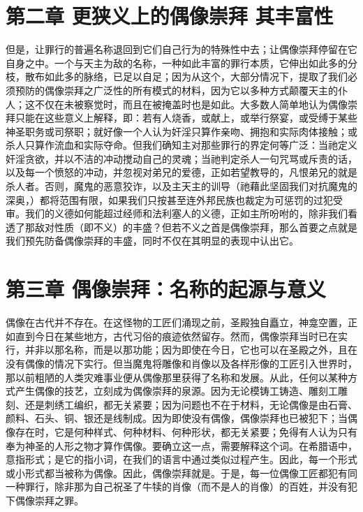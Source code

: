 
\section{第二章 更狭义上的偶像崇拜 其丰富性}

但是，让罪行的普遍名称退回到它们自己行为的特殊性中去；让偶像崇拜停留在它自身之中。一个与天主为敌的名称，一种如此丰富的罪行本质，它伸出如此多的分枝，散布如此多的脉络，已足以自足；因为从这个，大部分情况下，提取了我们必须预防的偶像崇拜之广泛性的所有模式的材料，因为它以多种方式颠覆天主的仆人；这不仅在未被察觉时，而且在被掩盖时也是如此。大多数人简单地认为偶像崇拜只能在这些意义上解释，即：若有人烧香，或献上，或举行祭宴，或受缚于某些神圣职务或司祭职；就好像一个人认为奸淫只算作亲吻、拥抱和实际肉体接触；或杀人只算作流血和实际夺命。但我们确知主对那些罪行的界定何等广泛：当祂定义奸淫贪欲，并以不洁的冲动搅动自己的灵魂；当祂判定杀人一句咒骂或斥责的话，以及每一个愤怒的冲动，并忽视对弟兄的爱德，正如若望教导的，凡恨弟兄的就是杀人者。否则，魔鬼的恶意狡诈，以及主天主的训导（祂藉此坚固我们对抗魔鬼的深奥，）都将范围有限，如果我们只按甚至连外邦民族也裁定为可惩罚的过犯受审。我们的义德如何能超过经师和法利塞人的义德，正如主所吩咐的，除非我们看透了那敌对性质（即不义）的丰盛？但若不义之首是偶像崇拜，那么首要之点就是我们预先防备偶像崇拜的丰盛，同时不仅在其明显的表现中认出它。\par


\section{第三章 偶像崇拜：名称的起源与意义}

偶像在古代并不存在。在这怪物的工匠们涌现之前，圣殿独自矗立，神龛空置，正如直到今日在某些地方，古代习俗的痕迹依然留存。然而，偶像崇拜当时已在实行，并非以那名称，而是以那功能；因为即使在今日，它也可以在圣殿之外，且在没有偶像的情况下实行。但当魔鬼将雕像和肖像以及各样形像的工匠引入世界时，那以前粗陋的人类灾难事业便从偶像那里获得了名称和发展。从此，任何以某种方式产生偶像的技艺，立刻成为偶像崇拜的泉源。因为无论模铸工铸造、雕刻工雕刻、还是刺绣工编织，都无关紧要；因为问题也不在于材料，无论偶像是由石膏、颜料、石头、铜、银还是线制成。因为即使没有偶像，偶像崇拜也已被犯下；当偶像存在时，它是何种样式、何种材料、何种形状，都无关紧要；免得有人认为只有奉为神圣的人形之物才算作偶像。要确立这一点，需要解释这个词。在希腊语中，意指形式；是它的指小词，在我们的语言中通过类似过程产生。因此，每一个形式或小形式都当被称为偶像。因此，偶像崇拜就是。于是，每一位偶像工匠都犯有同一种罪行，除非那为自己祝圣了牛犊的肖像（而不是人的肖像）的百姓，并没有犯下偶像崇拜之罪。\par

